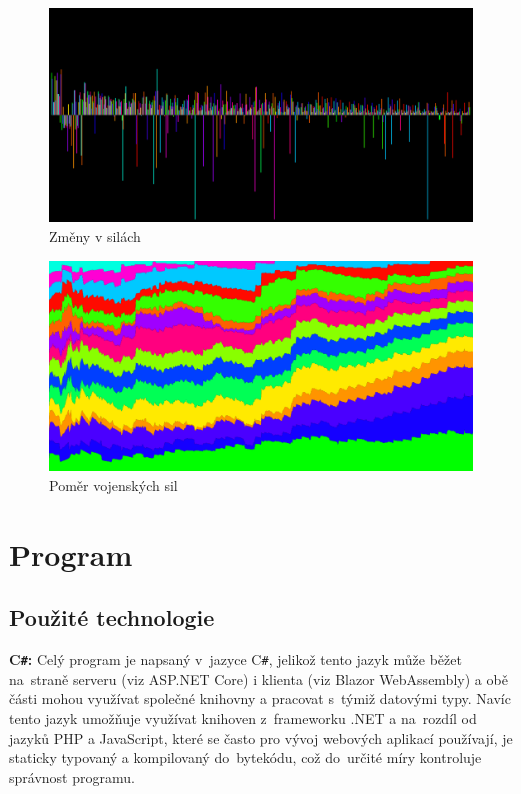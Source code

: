 \documentclass[a4paper,12pt]{article}
\def\CS{C\texttt{\#}}
\begin{document}
\begin{figure}[H]
	\includegraphics[width=\textwidth]{ChangesGraph.png}
	\caption{Změny v silách}
\end{figure}

\begin{figure}[H]
	\includegraphics[width=\textwidth]{LayerGraph.png}
	\caption{Poměr vojenských sil}
\end{figure}

\section{Program}
\subsection{Použité technologie}
\textbf{\CS{}: }Celý program je napsaný v~jazyce \CS{}, jelikož tento jazyk může běžet na~straně serveru (viz ASP.NET Core) i klienta (viz Blazor WebAssembly) a obě části mohou využívat společné knihovny a pracovat s~týmiž datovými typy. Navíc tento jazyk umožňuje využívat knihoven z~frameworku .NET a na~rozdíl od jazyků PHP a JavaScript, které se často pro vývoj webových aplikací používají, je staticky typovaný a kompilovaný do~bytekódu, což do~určité míry kontroluje správnost programu.
\end{document}

